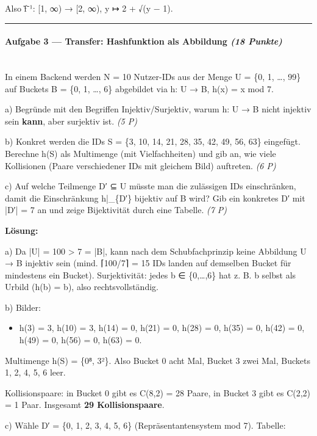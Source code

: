 \documentclass[11pt, a4paper]{article}
\begin{document}
Also f̃⁻¹: [1, ∞) → [2, ∞), y ↦ 2 + √(y − 1).



\noindent\textcolor{rulegray}{\rule{\linewidth}{0.4pt}}


\paragraph{Aufgabe 3 — Transfer: Hashfunktion als Abbildung \textit{(18 Punkte)}}\mbox{}\\[2pt]

In einem Backend werden N = 10 Nutzer-IDs aus der Menge U = \{0, 1, …, 99\} auf Buckets B = \{0, 1, …, 6\} abgebildet via h: U → B, h(x) = x mod 7.


a) Begründe mit den Begriffen Injektiv/Surjektiv, warum h: U → B nicht injektiv sein \textbf{kann}, aber surjektiv ist. \textit{(5 P)}


b) Konkret werden die IDs S = \{3, 10, 14, 21, 28, 35, 42, 49, 56, 63\} eingefügt. Berechne h(S) als Multimenge (mit Vielfachheiten) und gib an, wie viele Kollisionen (Paare verschiedener IDs mit gleichem Bild) auftreten. \textit{(6 P)}


c) Auf welche Teilmenge D′ ⊆ U müsste man die zulässigen IDs einschränken, damit die Einschränkung h|\_\{D′\} bijektiv auf B wird? Gib ein konkretes D′ mit |D′| = 7 an und zeige Bijektivität durch eine Tabelle. \textit{(7 P)}


\textbf{Lösung:}


a) Da |U| = 100 > 7 = |B|, kann nach dem Schubfachprinzip keine Abbildung U → B injektiv sein (mind. ⌈100/7⌉ = 15 IDs landen auf demselben Bucket für mindestens ein Bucket). Surjektivität: jedes b ∈ \{0,…,6\} hat z. B. b selbst als Urbild (h(b) = b), also rechtsvollständig.


b) Bilder:

\begin{itemize}
  \item h(3) = 3, h(10) = 3, h(14) = 0, h(21) = 0, h(28) = 0, h(35) = 0, h(42) = 0, h(49) = 0, h(56) = 0, h(63) = 0.
\end{itemize}

Multimenge h(S) = \{0⁸, 3²\}. Also Bucket 0 acht Mal, Bucket 3 zwei Mal, Buckets 1, 2, 4, 5, 6 leer.


Kollisionspaare: in Bucket 0 gibt es C(8,2) = 28 Paare, in Bucket 3 gibt es C(2,2) = 1 Paar. Insgesamt \textbf{29 Kollisionspaare}.


c) Wähle D′ = \{0, 1, 2, 3, 4, 5, 6\} (Repräsentantensystem mod 7). Tabelle:
\end{document}
